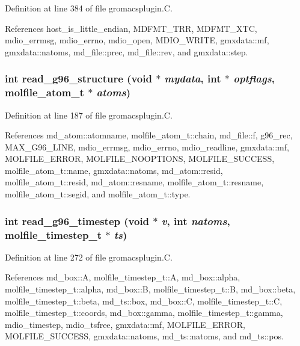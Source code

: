 Definition at line 384 of file gromacsplugin.C.

References host\_\-is\_\-little\_\-endian, MDFMT\_\-TRR, MDFMT\_\-XTC, mdio\_\-errmsg, mdio\_\-errno, mdio\_\-open, MDIO\_\-WRITE, gmxdata::mf, gmxdata::natoms, md\_\-file::prec, md\_\-file::rev, and gmxdata::step.
\subsubsection{\setlength{\rightskip}{0pt plus 5cm}int read\_\-g96\_\-structure (void $\ast$ {\em mydata}, int $\ast$ {\em optflags}, {\bf molfile\_\-atom\_\-t} $\ast$ {\em atoms})\hspace{0.3cm}{\tt  [static]}}\label{gromacsplugin_8C_a12}




Definition at line 187 of file gromacsplugin.C.

References md\_\-atom::atomname, molfile\_\-atom\_\-t::chain, md\_\-file::f, g96\_\-rec, MAX\_\-G96\_\-LINE, mdio\_\-errmsg, mdio\_\-errno, mdio\_\-readline, gmxdata::mf, MOLFILE\_\-ERROR, MOLFILE\_\-NOOPTIONS, MOLFILE\_\-SUCCESS, molfile\_\-atom\_\-t::name, gmxdata::natoms, md\_\-atom::resid, molfile\_\-atom\_\-t::resid, md\_\-atom::resname, molfile\_\-atom\_\-t::resname, molfile\_\-atom\_\-t::segid, and molfile\_\-atom\_\-t::type.
\subsubsection{\setlength{\rightskip}{0pt plus 5cm}int read\_\-g96\_\-timestep (void $\ast$ {\em v}, int {\em natoms}, {\bf molfile\_\-timestep\_\-t} $\ast$ {\em ts})\hspace{0.3cm}{\tt  [static]}}\label{gromacsplugin_8C_a13}




Definition at line 272 of file gromacsplugin.C.

References md\_\-box::A, molfile\_\-timestep\_\-t::A, md\_\-box::alpha, molfile\_\-timestep\_\-t::alpha, md\_\-box::B, molfile\_\-timestep\_\-t::B, md\_\-box::beta, molfile\_\-timestep\_\-t::beta, md\_\-ts::box, md\_\-box::C, molfile\_\-timestep\_\-t::C, molfile\_\-timestep\_\-t::coords, md\_\-box::gamma, molfile\_\-timestep\_\-t::gamma, mdio\_\-timestep, mdio\_\-tsfree, gmxdata::mf, MOLFILE\_\-ERROR, MOLFILE\_\-SUCCESS, gmxdata::natoms, md\_\-ts::natoms, and md\_\-ts::pos.
